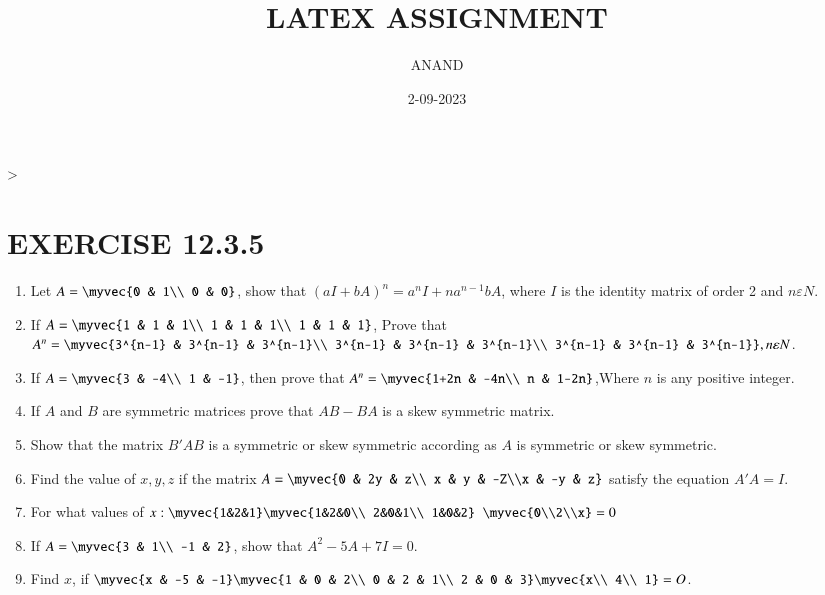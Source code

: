 \documentclass{article}
\theoremstyle{remark}
\begin{document}
\title{LATEX ASSIGNMENT}
\author{ANAND}
\date{2-09-2023}
\maketitle                                                                       >
\section*{EXERCISE 12.3.5}
\begin{enumerate}
\item Let $A=\myvec{0 & 1\\ 0 & 0}$, show that $(aI+bA)^n= a^nI+na^{n-1} bA$, where $I$ is the identity matrix of order 2 and $n \varepsilon N$.
\item If $A=\myvec{1 & 1 & 1\\ 1 & 1 & 1\\ 1 & 1 & 1}$, Prove that $A^n=\myvec{3^{n-1} & 3^{n-1} & 3^{n-1}\\ 3^{n-1} & 3^{n-1} & 3^{n-1}\\ 3^{n-1} & 3^{n-1} & 3^{n-1}}, n \varepsilon N$.
\item If $A=\myvec{3 & -4\\ 1 & -1}$, then prove that $A^n=\myvec{1+2n & -4n\\ n & 1-2n}$,Where $n$ is any positive integer.
\item If $A$ and $B$ are symmetric matrices prove that $AB-BA$ is a skew symmetric matrix.
\item Show that the matrix  $B'AB$ is a symmetric or skew symmetric according as $A$ is symmetric or skew symmetric.
\item Find the value of $x,y,z$ if the matrix $A=\myvec{0 & 2y & z\\ x & y & -Z\\x & -y & z}$ satisfy the equation $A'A=I$.
\item For what values  of $x : \myvec{1&2&1} \myvec{1&2&0\\ 2&0&1\\ 1&0&2}$ $\myvec{0\\2\\x}=0$
\item If $A=\myvec{3 & 1\\ -1 & 2}$, show that $A^2-5A+7I=0$.
\item Find $x$, if $\myvec{x & -5 & -1} \myvec{1 & 0 & 2\\ 0 & 2 & 1\\ 2 & 0 & 3} \myvec{x\\ 4\\ 1}=O$. 

\end{enumerate}
\end{document}
